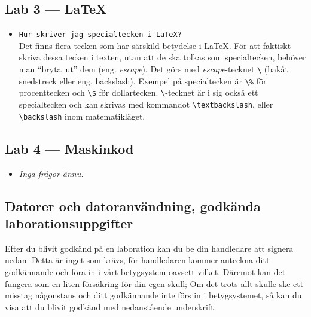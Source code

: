 \documentclass[fleqn, article, a4paper]{memoir}
\begin{document}
\subsection{Lab 3 --- \LaTeX}

\begin{itemize}
	\item \texttt{Hur skriver jag specialtecken i \LaTeX{}?}\\
	      Det finns flera tecken som har särskild betydelse i \LaTeX{}. För att faktiskt skriva dessa tecken i texten, utan att de ska tolkas som specialtecken, behöver man ``bryta~ut'' dem (eng. \emph{escape}). Det görs med \emph{escape}-tecknet \texttt{\textbackslash} (bakåt snedstreck eller eng. backslash). Exempel på specialtecken är \texttt{\textbackslash\%} för procenttecken och \texttt{\textbackslash\$} för dollartecken. \texttt{\textbackslash}-tecknet är i sig också ett specialtecken och kan skrivas med kommandot \texttt{\textbackslash{textbackslash}}, eller \texttt{\textbackslash{backslash}} inom matematikläget.

\end{itemize}

\subsection{Lab 4 --- Maskinkod}
\begin{itemize}
	\item \emph{Inga frågor ännu.}
\end{itemize}

\newpage


\newpage


\newpage


\newpage


\newpage


\newpage

\subsection*{Datorer och datoranvändning, godkända laborationsuppgifter}

Efter du blivit godkänd på en laboration kan du be din handledare att signera nedan. Detta är inget som krävs, för handledaren kommer anteckna ditt godkännande och föra in i vårt betygsystem oavsett vilket. Däremot kan det fungera som en liten försäkring för din egen skull; Om det trots allt skulle ske ett misstag någonstans och ditt godkännande inte förs in i betygsystemet, så kan du visa att du blivit godkänd med nedanstående underskrift.
\end{document}
